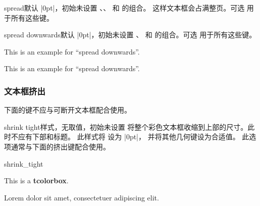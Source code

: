 \begin{docTcbKey}[][doc new=2017-02-13]{spread}{}{默认 |0pt|，初始未设置}
  、、
   和  的组合。
  这样文本框会占满整页。可选  用于所有这些键。
\end{docTcbKey}


\begin{docTcbKey}[][doc new=2017-02-13]{spread downwards}{}{默认 |0pt|，初始未设置}
  、 和
   的组合。可选  用于所有这些键。
\begin{dispListing}
\begin{tcolorbox}[enhanced,spread downwards,sharp corners=south,
  colframe=red!75!black,interior style={top color=white,bottom color=red!50}]
This is an example for \enquote{spread downwards}.
\end{tcolorbox}
\end{dispListing}
\end{docTcbKey}
\begin{tcolorbox}[enhanced,spread downwards,sharp corners=south,
  colframe=red!75!black,interior style={top color=white,bottom color=red!50}]
This is an example for \enquote{spread downwards}.
\end{tcolorbox}




\clearpage
\subsubsection{文本框挤出}

\begin{marker}
下面的键不应与可断开文本框配合使用。
\end{marker}

\begin{docTcbKey}{shrink tight}{}{样式，无取值，初始未设置}
  将整个彩色文本框收缩到上部的尺寸。此时不应有下部和标题。
  此样式将  设为 |0pt|，
  并将其他几何键设为合适值。
  此选项通常与下面的挤出键配合使用。
\begin{exdispExample}{shrink_tight}

\begin{tcolorbox}
This is a \textbf{tcolorbox}.
\end{tcolorbox}

Lorem  dolor sit amet, consectetuer adipiscing elit.
\end{exdispExample}
\end{docTcbKey}

